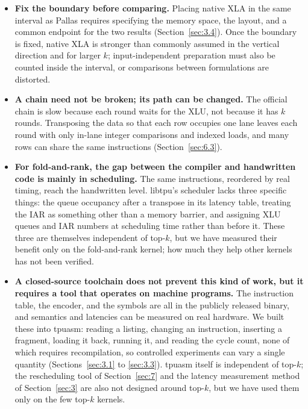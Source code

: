 \documentclass[sigconf,nonacm,balance=false]{acmart}
\begin{document}
\begin{itemize}
\item \textbf{Fix the boundary before comparing.} Placing native XLA in the same interval as Pallas requires specifying the memory space, the layout, and a common endpoint for the two results (Section~\ref{sec:3.4}). Once the boundary is fixed, native XLA is stronger than commonly assumed in the vertical direction and for larger $k$; input-independent preparation must also be counted inside the interval, or comparisons between formulations are distorted.
\item \textbf{A chain need not be broken; its path can be changed.} The official chain is slow because each round waits for the XLU, not because it has $k$ rounds. Transposing the data so that each row occupies one lane leaves each round with only in-lane integer comparisons and indexed loads, and many rows can share the same instructions (Section~\ref{sec:6.3}).
\item \textbf{For fold-and-rank, the gap between the compiler and handwritten code is mainly in scheduling.} The same instructions, reordered by real timing, reach the handwritten level. libtpu's scheduler lacks three specific things: the queue occupancy after a transpose in its latency table, treating the IAR as something other than a memory barrier, and assigning XLU queues and IAR numbers at scheduling time rather than before it. These three are themselves independent of top-$k$, but we have measured their benefit only on the fold-and-rank kernel; how much they help other kernels has not been verified.
\item \textbf{A closed-source toolchain does not prevent this kind of work, but it requires a tool that operates on machine programs.} The instruction table, the encoder, and the symbols are all in the publicly released binary, and semantics and latencies can be measured on real hardware. We built these into tpuasm: reading a listing, changing an instruction, inserting a fragment, loading it back, running it, and reading the cycle count, none of which requires recompilation, so controlled experiments can vary a single quantity (Sections~\ref{sec:3.1} to \ref{sec:3.3}). tpuasm itself is independent of top-$k$; the rescheduling tool of Section~\ref{sec:7} and the latency measurement method of Section~\ref{sec:3} are also not designed around top-$k$, but we have used them only on the few top-$k$ kernels.

\end{itemize}
\end{document}
